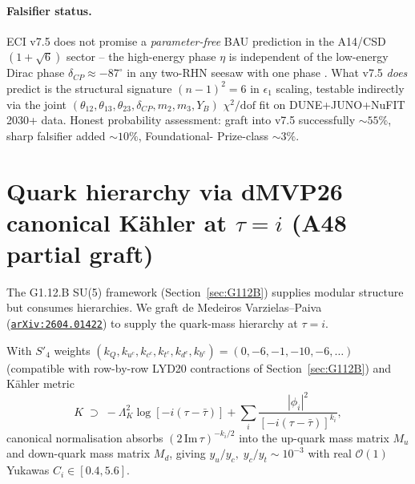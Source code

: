 \documentclass[a4paper,11pt]{article}
\newcommand{\Spf}{S'_4}
\newcommand{\arXiv}[1]{\href{https://arxiv.org/abs/#1}{\texttt{arXiv:#1}}}
\theoremstyle{definition}
\theoremstyle{remark}
\begin{document}
\paragraph{Falsifier status.}  ECI v7.5 does not promise a
\emph{parameter-free} BAU prediction in the
A14/CSD$(1+\sqrt 6)$ sector -- the high-energy phase $\eta$ is
independent of the low-energy Dirac phase
$\delta_{CP}\approx -87^{\circ}$ in any two-RHN seesaw with
one phase \cite{KMSR18}.  What v7.5 \emph{does}
predict is the structural signature $(n-1)^2=6$ in $\epsilon_1$
scaling, testable indirectly via the joint
$(\theta_{12},\theta_{13},\theta_{23},\delta_{CP},m_2,m_3,Y_B)$
$\chi^2/\mathrm{dof}$ fit on DUNE+JUNO+NuFIT 2030+ data.  Honest
probability assessment: graft into v7.5 successfully
$\sim 55\%$, sharp falsifier added $\sim 10\%$, Foundational-%
Prize-class $\sim 3\%$.

\section{Quark hierarchy via dMVP26 canonical K\"ahler at
         $\tau=i$ (A48 partial graft)}
\label{sec:dMVP26}

The G1.12.B SU(5) framework (Section~\ref{sec:G112B}) supplies
modular structure but consumes hierarchies.  We graft de
Medeiros Varzielas--Paiva~\cite{dMVP26} (\arXiv{2604.01422}) to
supply the quark-mass hierarchy at $\tau=i$.

With $\Spf$ weights $(k_Q,k_{u^c},k_{c^c},k_{t^c},k_{d^c},k_{b^c})
= (0,-6,-1,-10,-6,\ldots)$ (compatible with row-by-row LYD20
contractions of Section~\ref{sec:G112B}) and K\"ahler metric
\[
  K \;\supset\; -\Lambda_K^{2}\log[-i(\tau-\bar\tau)]
            + \sum_i \frac{|\phi_i|^2}{[-i(\tau-\bar\tau)]^{k_i}} ,
\]
canonical normalisation absorbs $(2\,\mathrm{Im}\,\tau)^{-k_i/2}$
into the up-quark mass matrix $M_u$ and down-quark mass matrix
$M_d$, giving $y_u/y_c,\;y_c/y_t \sim 10^{-3}$ with real
$\mathcal{O}(1)$ Yukawas $C_i\in[0.4,5.6]$.
\end{document}
